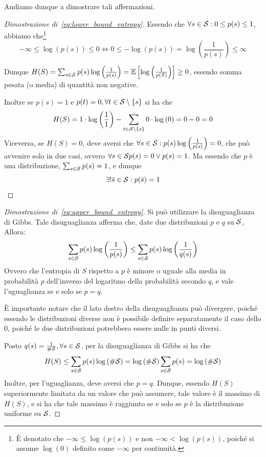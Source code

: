 Andiamo dunque a dimostrare tali affermazioni.

\begin{proof}[Dimostrazione di~\ref{eq:lower_bound_entropy}]
  Essendo che \(\forall s \in \mathcal{S}: 0\leq p(s) \leq 1\), abbiamo che\footnote{È denotato che \(-\infty \leq \log\left(p(s)\right)\) e non \(-\infty < \log\left(p(s)\right)\), poiché si assume \(\log\left(0\right)\) definito come \(-\infty\) per continuità.}
  \[-\infty \leq \log\left(p(s)\right) \leq 0 \iff  0 \leq -\log\left(p(s)\right) = \log\left(\frac{1}{p(s)}\right) \leq \infty\]

  Dunque \(H(S) = \sum_{s \in \SCal} p(s) \log\left(\frac{1}{p(s)}\right) = \EV{\log\left(\frac{1}{p(S)}\right)} \geq 0\), essendo somma pesata (o media) di quantità non negative.

  Inoltre se \(p(s) = 1\) e \(p(t) = 0, \forall t \in \SCal \setminus \set{s}\) si ha che
  \[H(S) = 1 \cdot \log\left(\frac{1}{1}\right) - \sum_{t \in \SCal \setminus \set{s}} 0 \cdot \log\left(0\right) = 0 - 0 = 0\]
  Viceversa, se \(H(S) = 0\), deve aversi che \(\forall s \in \mathcal{S}: p(s) \log\left(\frac{1}{p(s)}\right) = 0\), che può avvenire solo in due casi, ovvero \(\forall s \in \mathcal{S} p(s) = 0 \lor p(s) = 1\).
  Ma essendo che \(p\) è una distribuzione, \(\sum_{s \in \mathcal{S}} p(s) = 1\), e dunque
  \[\exists!\bar{s} \in \mathcal{S}: p(\bar{s}) = 1\]
\end{proof}

\begin{proof}[Dimostrazione di~\ref{eq:upper_bound_entropy}]
  Si può utilizzare la disuguaglianza di Gibbs.
  Tale disuguaglianza afferma che, date due distribuzioni \(p\) e \(q\) su \(\mathcal{S}\), Allora:
  \begin{equation}\label{eq:gibbs}
    \sum_{s \in \mathcal{S}} p(s) \log\left(\frac{1}{p(s)}\right) \leq \sum_{s \in \mathcal{S}} p(s) \log\left(\frac{1}{q(s)}\right)
  \end{equation}
  Ovvero che l'entropia di \(S\) rispetto a \(p\) è minore o uguale alla media in probabilità \(p\) dell'inverso del logaritmo della probabilità secondo \(q\), e vale l'uguaglianza se e solo se \(p = q\).
  \begin{note}{}
    È importante notare che il lato destro della disuguaglianza può divergere, poiché essendo le distribuzioni diverse non è possibile definire separatamente il caso dello \(0\), poiché le due distribuzioni potrebbero essere nulle in punti diversi.
  \end{note}
  Posto \(q(s) = \frac{1}{\#\mathcal{S}}, \forall s \in \mathcal{S}\), per la disuguaglianza di Gibbs si ha che
  \[H(S) \leq \sum_{s \in \mathcal{S}} p(s) \log\left(\#\mathcal{S}\right) = \log\left(\#\mathcal{S}\right)\sum_{s \in \mathcal{S}} p(s) = \log\left(\#\mathcal{S}\right)\]
  Inoltre, per l'uguaglianza, deve aversi che \(p = q\). Dunque, essendo \(H(S)\) superiormente limitata da un valore che può assumere, tale valore è il massimo di \(H(S)\), e si ha che tale massimo è raggiunto se e solo se \(p\) è la distribuzione uniforme su \(\mathcal{S}\).
\end{proof}

